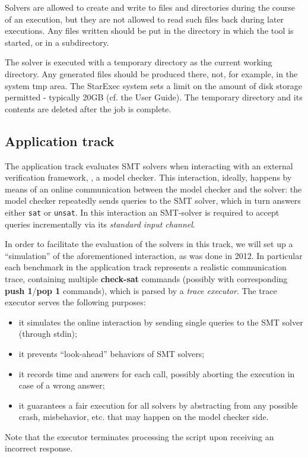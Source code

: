 \documentclass[12pt]{article}
\newcommand{\akey}[1]{\textbf{#1}}
\begin{document}
Solvers are allowed to create and write to
files and directories during the course of an execution, but they are
not allowed to read such files back during later executions.  Any
files written should be put in the directory in which the tool is
started, or in a subdirectory.

The solver is executed with a temporary directory as the current working directory.
Any generated files should be produced there, not, for example, in the system tmp area.
The StarExec system sets a limit on the amount of disk storage permitted - typically 20GB (cf. the User Guide).
The temporary directory and its contents are deleted after the job is complete.

\subsection{Application track}
\label{sec:exec:application}

The application track evaluates SMT solvers when interacting
with an external verification framework, \eg, a model
checker. This interaction, ideally, happens by means of an online
communication between the model checker and the solver: the model
checker repeatedly sends queries to the SMT solver, which in turn
answers either \texttt{sat} or \texttt{unsat}.  In this interaction an SMT-solver is
required to accept queries incrementally via its {\em standard input channel}.

In order to facilitate the evaluation of the solvers in this track, we
will set up a ``simulation'' of the aforementioned interaction, as was done in 2012. In
particular each benchmark in the application track represents a realistic
communication trace, containing multiple \akey{check-sat} commands (possibly
with corresponding \akey{push 1}/\akey{pop 1} commands), which
is parsed by a {\em trace executor}. The trace executor serves the following purposes:
\begin{itemize}
\item it simulates the online interaction by sending single queries to the SMT solver
      (through stdin);
\item it prevents ``look-ahead'' behaviors of SMT solvers;
\item it records time and answers for each call, possibly aborting the execution
      in case of a wrong answer;
\item it guarantees a fair execution for all solvers by abstracting from any possible
      crash, misbehavior, etc. that may happen on the model checker side.
\end{itemize}
Note that the executor terminates processing the script upon receiving an incorrect response.
\end{document}
